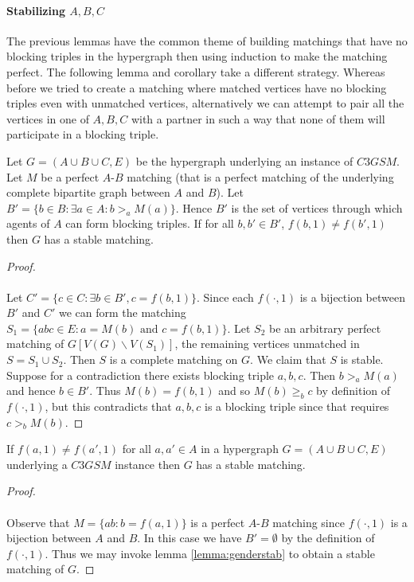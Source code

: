 \paragraph{Stabilizing $A,B,C$}
The previous lemmas have the common theme of building matchings that have no blocking triples in the hypergraph then using induction to make the matching perfect. The following lemma and corollary take a different strategy. Whereas before we tried to create a matching where matched vertices have no blocking triples even with unmatched vertices, alternatively we can attempt to pair all the vertices in one of $A,B,C$ with a partner in such a way that none of them will participate in a blocking triple.
\begin{lemma}\label{lemma:genderstab}
Let $G=(A\cup B\cup C, E)$ be the hypergraph underlying an instance of $C3GSM$. Let $M$ be a perfect $A$-$B$ matching (that is a perfect matching of the underlying complete bipartite graph between $A$ and $B$). Let $B' = \{ b \in B : \exists a \in A : b >_a M(a) \}$. Hence $B'$ is the set of vertices through which agents of $A$ can form blocking triples. If for all $b, b' \in B'$, $f(b,1) \neq f(b',1)$ then $G$ has a stable matching.
\end{lemma}
\begin{proof}
\paragraph{}
Let $C' = \{ c \in C : \exists b\in B', c = f(b,1)\}$. Since each $f(\cdot,1)$ is a bijection between $B'$ and $C'$ we can form the matching $S_1 = \{abc \in E: a = M(b)\text{ and } c = f(b,1)\}$. Let $S_2$ be an arbitrary perfect matching of $G[V(G) \backslash V(S_1)]$, the remaining vertices unmatched in $S = S_1 \cup S_2$. Then $S$ is a complete matching on $G$. We claim that $S$ is stable. Suppose for a contradiction there exists blocking triple $a,b,c$. Then $b >_a M(a)$ and hence $b \in B'$. Thus $M(b) = f(b,1)$ and so $M(b) \geq_b c$ by definition of $f(\cdot,1)$, but this contradicts that $a,b,c$ is a blocking triple since that requires $c >_b M(b)$.
\end{proof}
\begin{corollary}
If $f(a,1) \neq f(a',1)$ for all $a,a' \in A$ in a hypergraph $G=(A\cup B \cup C, E)$ underlying a $C3GSM$ instance then $G$ has a stable matching.
\end{corollary}
\begin{proof}
\paragraph{}
Observe that $M = \{ab : b = f(a,1)\}$ is a perfect $A$-$B$ matching since $f(\cdot, 1)$ is a bijection between $A$ and $B$. In this case we have $B' = \emptyset$ by the definition of $f(\cdot,1)$. Thus we may invoke lemma \ref{lemma:genderstab} to obtain a stable matching of $G$.
\end{proof}
